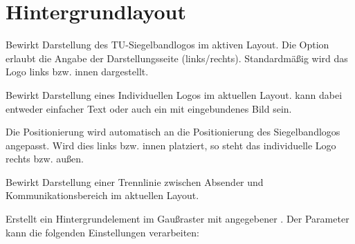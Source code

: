 \documentclass[a4paper,11pt]{tubsreprt}
\begin{document}






\chapter{Hintergrundlayout}

\begin{Declaration}
\end{Declaration}

Bewirkt Darstellung des TU-Siegelbandlogos im aktiven Layout.
Die Option  erlaubt die Angabe der Darstellungsseite
(links/rechts). Standardmäßig wird das Logo links bzw. innen dargestellt.

\begin{Declaration}
\end{Declaration}

Bewirkt Darstellung eines Individuellen Logos im aktuellen Layout.
 kann dabei entweder einfacher Text oder auch ein 
mit  eingebundenes Bild sein.

Die Positionierung wird automatisch an die Positionierung des Siegelbandlogos
angepasst. Wird dies links bzw. innen platziert, so steht das individuelle
Logo rechts bzw. außen.

\begin{Declaration}
\end{Declaration}

Bewirkt Darstellung einer Trennlinie zwischen Absender und Kommunikationsbereich
im aktuellen Layout.

\begin{Declaration}
\end{Declaration}

Erstellt ein Hintergrundelement im Gaußraster mit angegebener .
Der Parameter  kann die folgenden Einstellungen verarbeiten:

\begin{Declaration}
  \\
  \\
\end{Declaration}
\end{document}

